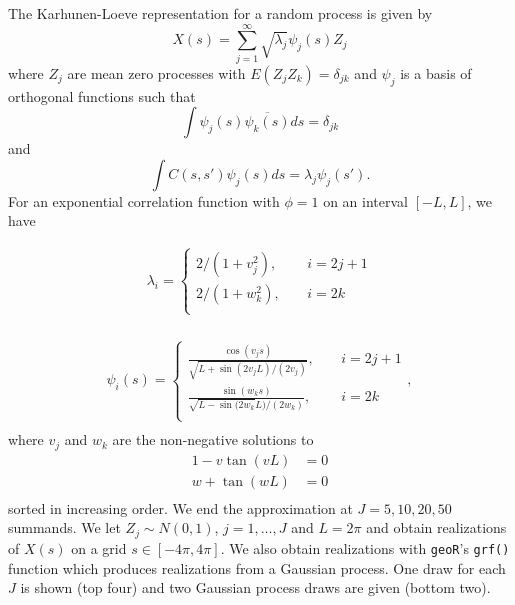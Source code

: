 \documentclass[12pt]{article}
\begin{document}
The Karhunen-Loeve representation for a random process is given by
\[ X(s)=\sum_{j=1}^\infty\sqrt{\lambda_j}\psi_j(s)Z_j \]
where $Z_j$ are mean zero processes with $E(Z_jZ_k)=\delta_{jk}$ and $\psi_j$ is a basis of orthogonal functions such that
\[ \int\psi_j(s)\overline{\psi_k(s)}ds = \delta_{jk} \]
and
\[ \int C(s,s')\psi_j(s)ds=\lambda_j\psi_j(s'). \]
For an exponential correlation function with $\phi=1$ on an interval $[-L,L]$, we have

\begin{align*}
\lambda_i = \begin{cases} 2/(1+v_j^2),~~~~~&i=2j+1 \\
 2/(1+w_k^2),~~~~~&i=2k \\
\end{cases} \\
\end{align*}

\begin{align*}
\psi_i(s) = \begin{cases} \frac{\cos(v_js)}{\sqrt{L+\sin(2v_jL)/(2v_j)}},~~~~~&i=2j+1 \\
 \frac{\sin(w_ks)}{\sqrt{L-\sin(2w_k}L)/(2w_k)},~~~~~&i=2k \\
\end{cases}, \\
\end{align*}
where $v_j$ and $w_k$ are the non-negative solutions to
\begin{align*}
1 - v\tan(vL) &= 0 \\
w + \tan(wL) &= 0 \\
\end{align*}
sorted in increasing order. We end the approximation at $J=5,10,20,50$ summands. We let $Z_j\sim N(0,1)$, $j=1,\ldots,J$ and $L=2\pi$ and obtain realizations of $X(s)$ on a grid $s\in[-4\pi, 4\pi]$. We also obtain realizations with \texttt{geoR}'s \texttt{grf()} function which produces realizations from a Gaussian process. One draw for each $J$ is shown (top four) and two Gaussian process draws are given (bottom two).
\end{document}
